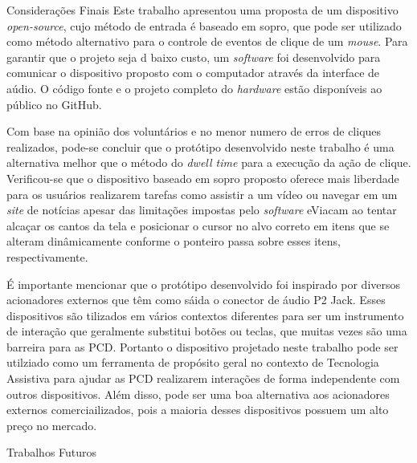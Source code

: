 \begin{chapter}{Considerações Finais}
Este trabalho apresentou uma proposta de um dispositivo \textit{open-source},
cujo método de entrada é baseado em sopro, que pode ser utilizado como método
alternativo para o controle de eventos de clique de um \textit{mouse}. Para
garantir que o projeto seja d baixo custo, um \textit{software} foi desenvolvido
para comunicar o dispositivo proposto com o computador através da interface de
aúdio. O código fonte e o projeto completo do \textit{hardware} estão
disponíveis ao público no GitHub.

Com base na opinião dos voluntários e no menor numero de erros de cliques
realizados, pode-se concluir que o protótipo desenvolvido neste trabalho é uma
alternativa melhor que o método do \textit{dwell time} para a execução da ação
de clique. Verificou-se que o dispositivo baseado em sopro proposto oferece mais
liberdade para os usuários realizarem tarefas como assistir a um vídeo ou navegar
em um \textit{site} de notícias apesar das limitações impostas pelo
\textit{software} eViacam ao tentar alcaçar os cantos da tela e posicionar o
cursor no alvo correto em itens que se alteram dinâmicamente conforme o ponteiro
passa sobre esses itens, respectivamente.

É importante mencionar que o protótipo desenvolvido foi inspirado por diversos
acionadores externos que têm como sáida o conector de áudio P2 Jack. Esses
dispositivos são tilizados em vários contextos diferentes para ser um
instrumento de interação que geralmente substitui botões ou teclas, que muitas
vezes são uma barreira para as PCD. Portanto o dispositivo projetado neste
trabalho pode ser utilziado como um ferramenta de propósito geral no contexto de
Tecnologia Assistiva para ajudar as PCD realizarem interações de forma
independente com outros dispositivos. Além disso, pode ser uma boa alternativa
aos acionadores externos comerciailizados, pois a maioria desses dispositivos
possuem um alto preço no mercado.

\begin{section}{Trabalhos Futuros}

\end{section}

\end{chapter}
